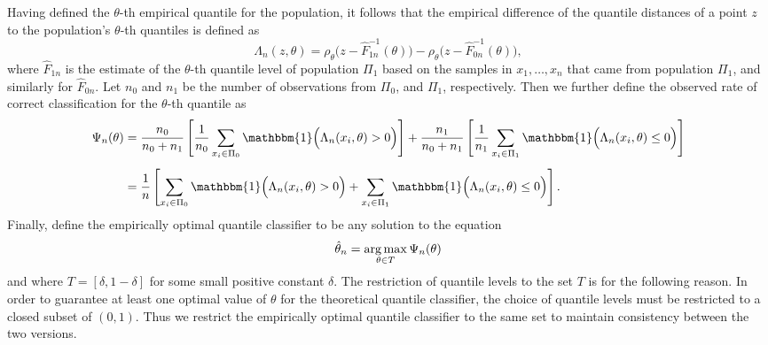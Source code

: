 Having defined the $\theta$-th empirical quantile for the population, it follows
that the empirical difference of the quantile distances of a point $z$ to the
population's $\theta$-th quantiles is defined as
\[
  \Lambda_n (z, \theta) = \rho_{\theta}\Big(z - \hat{F}_{1n}^{-1}(\theta)\Big) -
  \rho_{\theta}\Big(z - \hat{F}_{0n}^{-1}(\theta)\Big),
\]
where $\hat{F}_{1n}$ is the estimate of the $\theta$-th quantile level of
population $\Pi_1$ based on the samples in $x_1, \dots, x_n$ that came from
population $\Pi_1$, and similarly for $\hat{F}_{0n}$.  Let $n_0$ and $n_1$
be the number of observations from $\Pi_0$, and $\Pi_1$, respectively.  Then we
further define the observed rate of correct classification for the $\theta$-th
quantile as
\begin{align}
  \begin{split}
    \Psi_n(\theta)
    &= \frac{n_0}{n_0 + n_1} \left[
      \frac{1}{n_0} \sum_{x_i \in \Pi_0}
      \mathbbm{1}\Big( \Lambda_n(x_i, \theta) > 0 \Big)
    \right] +
      \frac{n_1}{n_0 + n_1} \left[
        \frac{1}{n_1} \sum_{x_i \in \Pi_1}
        \mathbbm{1}\Big( \Lambda_n(x_i, \theta) \leq 0 \Big)
      \right] \\[1ex]
    &= \frac{1}{n} \left[
      \sum_{x_i \in \Pi_0} \mathbbm{1}\Big( \Lambda_n(x_i, \theta) > 0 \Big) +
      \sum_{x_i \in \Pi_1} \mathbbm{1}\Big( \Lambda_n(x_i, \theta) \leq 0 \Big)
    \right].
  \end{split}
\end{align}
Finally, define the empirically optimal quantile classifier to be any solution
to the equation
\begin{equation}
  \label{eq:theta-hat}
  \hat{\theta}_n = \operatorname*{arg\,max}_{\theta \in T} \Psi_n(\theta)
\end{equation}
and where $T = [\delta, 1 - \delta]$ for some small positive constant $\delta$.
The restriction of quantile levels to the set $T$ is for the following reason.
In order to guarantee at least one optimal value of $\theta$ for the theoretical
quantile classifier, the choice of quantile levels must be restricted to a
closed subset of $(0, 1)$.  Thus we restrict the empirically optimal quantile
classifier to the same set to maintain consistency between the two versions.




